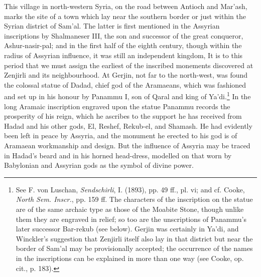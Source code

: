 \documentclass[12pt,oneside]{book}
\begin{document}
This village in north-western Syria, on the road between Antioch and Mar'ash, marks the site of a town which lay near the southern border or just within the Syrian district of Sam'al. The latter is first mentioned in the Assyrian inscriptions by Shalmaneser III, the son and successor of the great conqueror, Ashur-nasir-pal; and in the first half of the eighth century, though within the radius of Assyrian influence, it was still an independent kingdom, It is to this period that we must assign the earliest of the inscribed monements discovered at Zenjirli and its neighbourhood. At Gerjin, not far to the north-west, was found the colossal statue of Dadad, chief god of the Aramaeans, which was fashioned and set up in his honour by Panammu I, son of Qaral and king of Ya'di.\footnote{See F. von Luschan, \textit{Sendschirli}, I. (1893), pp. 49 ff., pl. vi; and cf. Cooke, \textit{North Sem. Inscr.}, pp. 159 ff. The characters of the inscription on the statue are of the same archaic type as those of the Moabite Stone, though unlike them they are engraved in relief; so too are the unscriptions of Panammu's later successor Bar-rekub (see below). Gerjin was certainly in Ya'di, and Winckler's suggestion that Zenjirli itself also lay in that district but near the border of Sam'al may be provisionally accepted; the occurrence of the names in the inscriptions can be explained in more than one way (see Cooke, op. cit., p. 183).} In the long Aramaic inscription engraved upon the statue Panammu records the prosperity of his reign, which he ascribes to the support he has received from Hadad and his other gods, El, Reshef, Rekub-el, and Shamash. He had evidently been left in peace by Assyria, and the monument he erected to his god is of Aramaean workmanship and design. But the influence of Assyria may be traced in Hadad's beard and in his horned head-dress, modelled on that worn by Babylonian and Assyrian gods as the symbol of divine power. \par 
\end{document}
